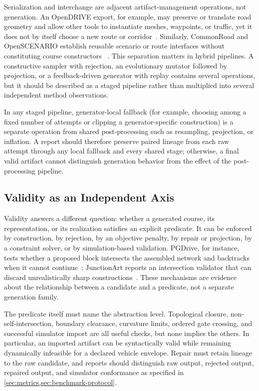 Serialization and interchange are adjacent artifact-management operations, not
generation.  An OpenDRIVE export, for example, may preserve or translate road
geometry and allow other tools to instantiate meshes, waypoints, or traffic, yet
it does not by itself choose a new route or corridor~\cite{Muktadir2023ProceduralGeneration}.
Similarly, CommonRoad and OpenSCENARIO establish reusable scenario or route
interfaces without constituting course constructors
~\cite{Althoff2017CommonRoadComposable,ASAM2024ASAMOpenSCENARIO}.  This
separation matters in hybrid pipelines.  A constructive sampler with rejection,
an evolutionary mutator followed by projection, or a feedback-driven generator
with replay contains several operations, but it should be described as a staged
pipeline rather than multiplied into several independent method observations.

In any staged pipeline, generator-local fallback (for example, choosing among a
fixed number of attempts or clipping a generator-specific construction) is a
separate operation from shared post-processing such as resampling, projection,
or inflation.  A report should therefore preserve paired lineage from each raw
attempt through any local fallback and every shared stage; otherwise, a final
valid artifact cannot distinguish generation behavior from the effect of the
post-processing pipeline.

\subsection{Validity as an Independent Axis}

Validity answers a different question: whether a generated course, its
representation, or its realization satisfies an explicit predicate.  It can be
enforced by construction, by rejection, by an objective penalty, by repair or
projection, by a constraint solver, or by simulation-based validation.  PGDrive,
for instance, tests whether a proposed block intersects the assembled network
and backtracks when it cannot continue~\cite{Li2020ImprovingGeneralization};
JunctionArt reports an intersection validator that can discard unrealistically
sharp constructions~\cite{Muktadir2023ProceduralGeneration}.  These mechanisms
are evidence about the relationship between a candidate and a predicate, not a
separate generation family.

The predicate itself must name the abstraction level.  Topological closure,
non-self-intersection, boundary clearance, curvature limits, ordered gate
crossing, and successful simulator import are all useful checks, but none implies
the others.  In particular, an imported artifact can be syntactically valid while
remaining dynamically infeasible for a declared vehicle envelope.  Repair must
retain lineage to the raw candidate, and reports should distinguish raw output,
rejected output, repaired output, and simulator conformance as specified in
\cref{sec:metrics,sec:benchmark-protocol}.

